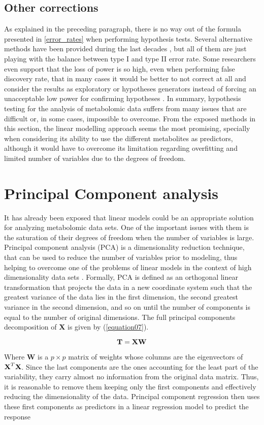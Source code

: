 \subsection{Other corrections}
As explained in the preceding paragraph, there is no way out of the formula presented in \autoref{error_rates} when performing hypothesis tests. Several alternative methods have been provided during the last decades \parencite{benjamini2001control, gao2008multiple, castro2015adjusted}, but all of them are just playing with the balance between type I and type II error rate. Some researchers even support that the loss of power is so high, even when performing false discovery rate, that in many cases it would be better to not correct at all and consider the results as exploratory or hypotheses generators instead of forcing an unacceptable low power for confirming hypotheses \parencite{bender2001adjusting}.
In summary, hypothesis testing for the analysis of metabolomic data suffers from many issues that are difficult or, in some cases, impossible to overcome. From the exposed methods in this section, the linear modelling approach seems the most promising, specially when considering its ability to use the different metabolites as predictors, although it would have to overcome its limitation regarding overfitting and limited number of variables due to the degrees of freedom. 

\section{Principal Component analysis}
\label{sec:PCA}
It has already been exposed that linear models could be an appropriate solution for analyzing metabolomic data sets. One of the important issues with them is the saturation of their degrees of freedom when the number of variables is large. Principal component analysis (PCA) is a dimensionality reduction technique, that can be used to reduce the number of variables prior to modeling, thus helping to overcome one of the problems of linear models in the context of high dimensionality data sets \parencite{wang2008principal}.
Formally, PCA is defined as an orthogonal linear transformation that projects the data in a new coordinate system such that the greatest variance of the data lies in the first dimension, the second greatest variance in the second dimension, and so on until the number of components is equal to the number of original dimensions. The full principal components decomposition of \textbf{X} is given by (\autoref{equation07}).

\begin{equation}
\label{equation07}
\textbf{\text{T}} = \textbf{\text{XW}}
\end{equation}

Where \textbf{W} is a $p \times p$ matrix of weights whose columns are the eigenvectors of $\textbf{\text{X}}^T\textbf{\text{X}}$. Since the last components are the ones accounting for the least part of the variability, they carry almost no information from the original data matrix. Thus, it is reasonable to remove them keeping only the first components and effectively reducing the dimensionality of the data. Principal component regression then uses these first components as predictors in a linear regression model to predict the response 